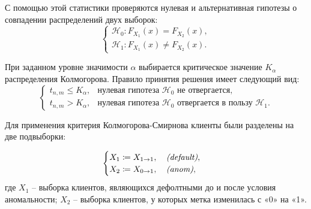 С помощью этой статистики проверяются нулевая и альтернативная гипотезы о совпадении распределений двух выборок:
\[
\begin{cases}
\mathcal{H}_0: F_{X_1}(x) = F_{X_2}(x),\\
\mathcal{H}_1: F_{X_1}(x) \neq F_{X_2}(x).
\end{cases}
\]

При заданном уровне значимости $\alpha$ выбирается критическое значение $K_\alpha$ распределения Колмогорова. Правило принятия решения имеет следующий вид:
\[
\begin{cases}
t_{n,m} \le K_\alpha, & \text{нулевая гипотеза } \mathcal{H}_0 \text{ не отвергается},\\
t_{n,m} > K_\alpha, & \text{нулевая гипотеза } \mathcal{H}_0 \text{ отвергается в пользу } \mathcal{H}_1.
\end{cases}
\]

Для применения критерия Колмогорова-Смирнова клиенты были разделены на две подвыборки:

\[
\begin{cases}
	X_1 \coloneqq X_{1 \to 1}, \textit{\quad (default)},\\
	X_2 \coloneqq X_{0 \to 1}, \textit{\quad (anom)},
\end{cases}
\] где $X_1$ -- выборка клиентов, являющихся дефолтными до и после условия аномальности;
$X_2$ --  выборка  клиентов, у которых метка изменилась с «0» на «1».


